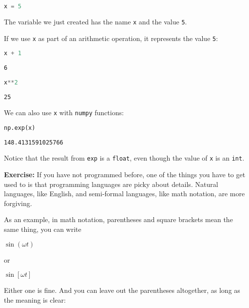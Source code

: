\begin{lstlisting}[language=Python,style=source]
x = 5
\end{lstlisting}

The variable we just created has the name \passthrough{\lstinline!x!}
and the value \passthrough{\lstinline!5!}.

If we use \passthrough{\lstinline!x!} as part of an arithmetic
operation, it represents the value \passthrough{\lstinline!5!}:

\begin{lstlisting}[language=Python,style=source]
x + 1
\end{lstlisting}

\begin{lstlisting}[style=output]
6
\end{lstlisting}

\begin{lstlisting}[language=Python,style=source]
x**2
\end{lstlisting}

\begin{lstlisting}[style=output]
25
\end{lstlisting}

We can also use \passthrough{\lstinline!x!} with
\passthrough{\lstinline!numpy!} functions:

\begin{lstlisting}[language=Python,style=source]
np.exp(x)
\end{lstlisting}

\begin{lstlisting}[style=output]
148.4131591025766
\end{lstlisting}

Notice that the result from \passthrough{\lstinline!exp!} is a
\passthrough{\lstinline!float!}, even though the value of
\passthrough{\lstinline!x!} is an \passthrough{\lstinline!int!}.

\textbf{Exercise:} If you have not programmed before, one of the things
you have to get used to is that programming languages are picky about
details. Natural languages, like English, and semi-formal languages,
like math notation, are more forgiving.

As an example, in math notation, parentheses and square brackets mean
the same thing, you can write

\(\sin (\omega t)\)

or

\(\sin [\omega t]\)

Either one is fine. And you can leave out the parentheses altogether, as
long as the meaning is clear:

